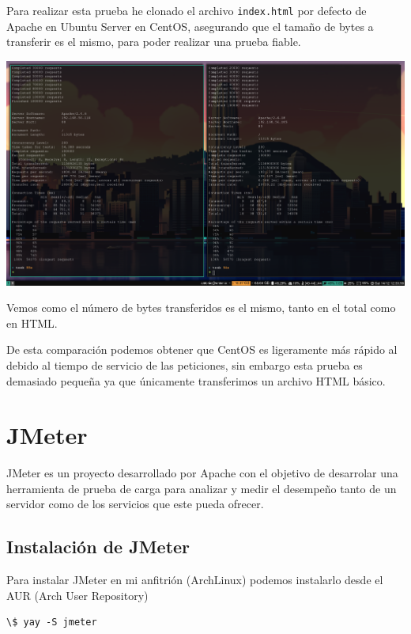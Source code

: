 \documentclass[12pt, spanish]{article}
\begin{document}
Para realizar esta prueba he clonado el archivo \texttt{index.html} por defecto de Apache en Ubuntu Server en CentOS, asegurando que el tamaño de bytes a transferir es el mismo, para poder realizar una prueba fiable.


\begin{center}
\includegraphics[scale=0.25]{ab-ubu-cent.png}
\end{center}

Vemos como el número de bytes transferidos es el mismo, tanto en el total como en HTML.

De esta comparación podemos obtener que CentOS es ligeramente más rápido al debido al tiempo de servicio de las peticiones, sin embargo esta prueba es demasiado pequeña ya que únicamente transferimos un archivo HTML básico.

\newpage

\section{JMeter}

JMeter\cite{main_jmeter} es un proyecto desarrollado por Apache con el objetivo de desarrolar una herramienta de prueba de carga para analizar y medir el desempeño tanto de un servidor como de los servicios que este pueda ofrecer.

\subsection{Instalación de JMeter}

Para instalar JMeter en mi anfitrión (ArchLinux) podemos instalarlo desde el AUR (Arch User Repository)

\begin{verbatim}
\$ yay -S jmeter 
\end{verbatim}
\end{document}
